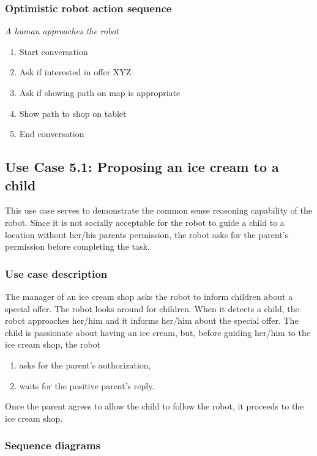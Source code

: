 \subsubsection{Optimistic robot action sequence}

\textit{A human approaches the robot}
\begin{enumerate}
\item Start conversation
\item Ask if interested in offer XYZ
\item Ask if showing path on map is appropriate
\item Show path to shop on tablet
\item End conversation
\end{enumerate}


\subsection{Use Case 5.1: Proposing an ice cream to a child}

This use case serves to demonstrate the common sense reasoning capability
of the robot. Since it is not socially acceptable for the robot to guide
a child to a location without her/his parents permission, the robot
asks for the parent's permission before completing the task.

\subsubsection{Use case description}

The manager of an ice cream shop asks the robot to inform children about
a special offer. The robot looks around for children. When it detects
a child, the robot approaches her/him and it informs her/him
about the special offer. The child is passionate about having an ice cream, 
but, before guiding her/him to the ice cream shop, the robot
\begin{enumerate}
\item asks for the parent's authorization,
\item waits for the positive parent's reply.
\end{enumerate}

\noindent Once the parent agrees to allow the child to follow the robot, it proceeds
to the ice cream shop.

\subsubsection{Sequence diagrams}

